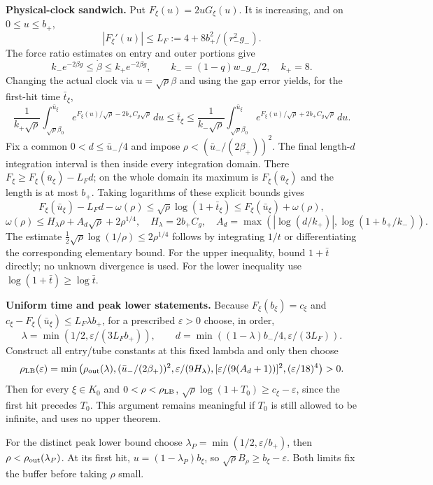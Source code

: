 \documentclass[11pt,a4paper]{article}
\begin{document}
\textbf{Physical-clock sandwich.} Put $F_\xi(u)=2uG_\xi(u)$. It is increasing, and on $0\le u\le b_+$,
\[
 |F_\xi'(u)|\le L_F:=4+8b_+^2/(r_-^2g_-).
\]
The force ratio estimates on entry and outer portions give
\[
 k_-e^{-2\beta g}\le\dot\beta\le k_+e^{-2\beta g},\qquad
 k_-=(1-q)w_-g_-/2,\quad k_+=8 .
\]
Changing the actual clock via $u=\sqrt\rho\beta$ and using the gap error yields, for the first-hit time $\bar t_\xi$,
\[
 \frac1{k_+\sqrt\rho}\int_{\sqrt\rho\beta_0}^{\bar u_\xi}
 e^{F_\xi(u)/\sqrt\rho-2b_+C_g\sqrt\rho}\,du
 \le\bar t_\xi\le
 \frac1{k_-\sqrt\rho}\int_{\sqrt\rho\beta_0}^{\bar u_\xi}
 e^{F_\xi(u)/\sqrt\rho+2b_+C_g\sqrt\rho}\,du .
\]
Fix a common $0<d\le\bar u_-/4$ and impose $\rho<(\bar u_-/(2\beta_+))^2$. The final length-$d$ integration interval is then inside every integration domain. There $F_\xi\ge F_\xi(\bar u_\xi)-L_Fd$; on the whole domain its maximum is $F_\xi(\bar u_\xi)$ and the length is at most $b_+$. Taking logarithms of these explicit bounds gives
\[
 F_\xi(\bar u_\xi)-L_Fd-\omega(\rho)
 \le\sqrt\rho\log(1+\bar t_\xi)\le F_\xi(\bar u_\xi)+\omega(\rho),
\]
\[
 \omega(\rho)\le H_\lambda\rho+A_d\sqrt\rho+2\rho^{1/4},\quad
 H_\lambda=2b_+C_g,\quad
 A_d=\max(|\log(d/k_+)|,\log(1+b_+/k_-)).
\]
The estimate $\frac12\sqrt\rho\log(1/\rho)\le2\rho^{1/4}$ follows by integrating $1/t$ or differentiating the corresponding elementary bound. For the upper inequality, bound $1+\bar t$ directly; no unknown divergence is used. For the lower inequality use $\log(1+\bar t)\ge\log\bar t$.

\textbf{Uniform time and peak lower statements.} Because $F_\xi(b_\xi)=c_\xi$ and $c_\xi-F_\xi(\bar u_\xi)\le L_F\lambda b_+$, for a prescribed $\varepsilon>0$ choose, in order,
\[
 \lambda=\min(1/2,\varepsilon/(3L_Fb_+)),\qquad
 d=\min((1-\lambda)b_-/4,\varepsilon/(3L_F)).
\]
Construct all entry/tube constants at this fixed lambda and only then choose
\[
 \rho_{\rm LB}(\varepsilon)=\min\left(
 \rho_{\rm out}(\lambda),(\bar u_-/(2\beta_+))^2,
 \varepsilon/(9H_\lambda),[\varepsilon/(9(A_d+1))]^2,
 (\varepsilon/18)^4\right)>0 .
\]
Then for every $\xi\in K_0$ and $0<\rho<\rho_{\rm LB}$,
$\sqrt\rho\log(1+T_0)\ge c_\xi-\varepsilon$, since the first hit precedes $T_0$. This argument remains meaningful if $T_0$ is still allowed to be infinite, and uses no upper theorem.

For the distinct peak lower bound choose $\lambda_P=\min(1/2,\varepsilon/b_+)$, then $\rho<\rho_{\rm out}(\lambda_P)$. At its first hit, $u=(1-\lambda_P)b_\xi$, so $\sqrt\rho B_\rho\ge b_\xi-\varepsilon$. Both limits fix the buffer before taking $\rho$ small.
\end{document}
